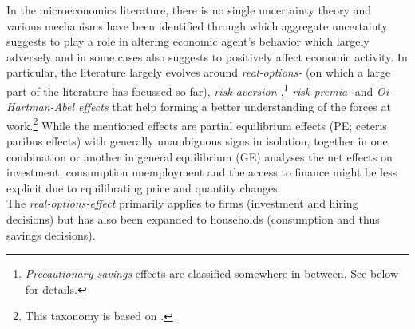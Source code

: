 \documentclass[a4paper,11pt,listof=nochaptergap,oneside,pointednumbers,bibtotoc,bigheadings,liststotoc,hidelinks]{scrbook}
\theoremstyle{mysatz}
\theoremstyle{mydefinition}
\theoremstyle{mytheorem}
\theoremstyle{mybemerkung}
\begin{document}
In the microeconomics literature, there is no single uncertainty theory and various mechanisms have been identified through which aggregate uncertainty suggests to play a role in altering economic agent's behavior which largely adversely and in some cases also suggests to positively affect economic activity. In particular, the literature largely evolves around \textit{real-options-} (on which a large part of the literature has focussed so far), \textit{risk-aversion-},\footnote{\textit{Precautionary savings} effects are classified somewhere in-between. See below for details.} \textit{risk premia-} and \textit{Oi-Hartman-Abel effects} that help forming a better understanding of the forces at work.\footnote{This taxonomy is based on \citet{bloom:14}.} While the mentioned effects are partial equilibrium effects (PE; ceteris paribus effects) with generally unambiguous signs in isolation, together in one combination or another in general equilibrium (GE) analyses the net effects on investment, consumption unemployment and the access to finance might be less explicit due to equilibrating price and quantity changes.\\

The \textit{real-options-effect} primarily applies to firms (investment and hiring decisions) but has also been expanded to households (consumption and thus savings decisions). 
\end{document}

